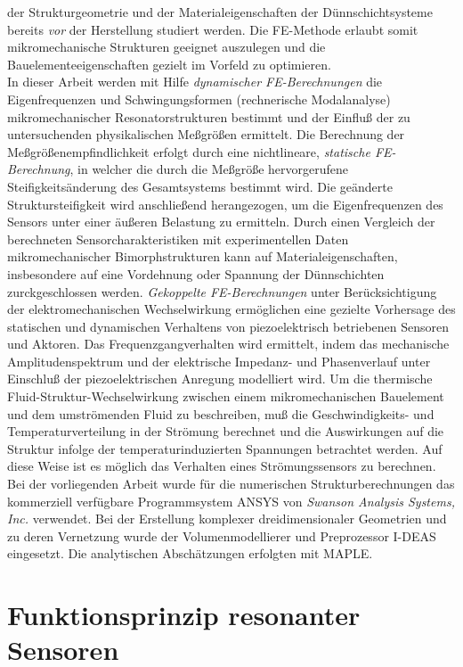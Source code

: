 der Strukturgeometrie und der Materialeigenschaften der Dünnschichtsysteme
bereits {\em vor} der Herstellung studiert werden. Die FE-Methode erlaubt
somit mikromechanische Strukturen geeignet auszulegen und die
Bauelementeeigenschaften gezielt
im Vorfeld zu optimieren.\\
In dieser Arbeit werden mit Hilfe {\em dynamischer FE-Berechnungen}
die Eigenfrequenzen und Schwingungsformen (rechnerische Modalanalyse)
mikromechanischer Resonatorstrukturen bestimmt
und der Einfluß der zu untersuchenden physikalischen Meßgrößen
ermittelt. Die Berechnung der Meßgrößenempfindlichkeit erfolgt
durch eine nichtlineare, {\em statische FE-Berechnung}, in welcher die
durch die Meßgröße hervorgerufene Steifigkeitsänderung des Gesamtsystems
bestimmt wird. Die geänderte Struktursteifigkeit wird anschließend
herangezogen, um die Eigenfrequenzen des Sensors unter einer äußeren
Belastung zu ermitteln. Durch einen Vergleich der berechneten
Sensorcharakteristiken mit experimentellen Daten mikromechanischer
Bimorphstrukturen kann auf Materialeigenschaften, insbesondere auf eine
Vordehnung oder Spannung der Dünnschichten zurckgeschlossen werden.
{\em  Gekoppelte FE-Berechnungen} unter
Berücksichtigung der elektromechanischen Wechselwirkung ermöglichen eine
gezielte Vorhersage des statischen und dynamischen Verhaltens von
piezoelektrisch betriebenen Sensoren und Aktoren. Das Frequenzgangverhalten
wird ermittelt, indem das mechanische Amplitudenspektrum und der
elektrische Impedanz- und Phasenverlauf unter Einschluß der
piezoelektrischen Anregung modelliert wird. Um die thermische
Fluid-Struktur-Wechselwirkung zwischen einem mikromechanischen
Bauelement und dem umströmenden Fluid zu beschreiben, muß die
Geschwindigkeits- und Temperaturverteilung in der Strömung berechnet
und die Auswirkungen auf die Struktur infolge der temperaturinduzierten
Spannungen betrachtet werden. Auf diese Weise ist es möglich das Verhalten
eines Strömungssensors zu berechnen.\\
Bei der vorliegenden Arbeit wurde für die numerischen Strukturberechnungen
das kommerziell verfügbare Programmsystem {\sf ANSYS} von
{\sl Swanson Analysis Systems, Inc.} \cite{SASI} verwendet.
Bei der Erstellung komplexer dreidimensionaler Geometrien
und zu deren Vernetzung wurde der Volumenmodellierer und Preprozessor
{\sf I-DEAS} \cite{SDRC} eingesetzt. Die analytischen Abschätzungen
erfolgten mit {\sf MAPLE}.


\section{Funktionsprinzip resonanter Sensoren}
\label{funktionsprinzip}


